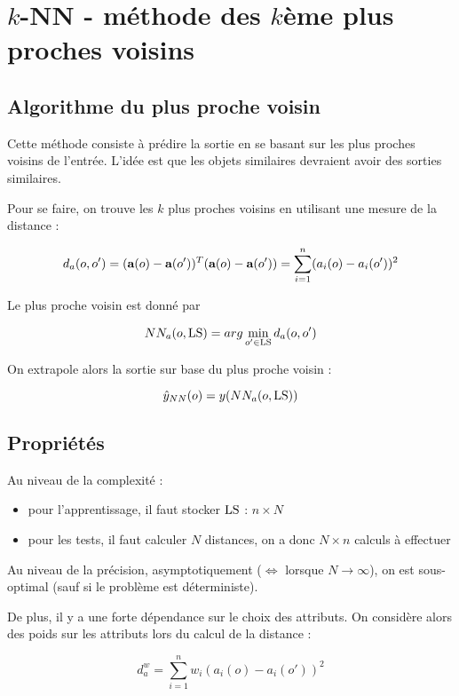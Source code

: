 \chapter{$k$-NN - méthode des $k$ème plus proches voisins}

	\section{Algorithme du plus proche voisin}
		
	Cette méthode consiste à prédire la sortie en se basant sur les plus proches voisins de l'entrée. L'idée est que les objets similaires devraient avoir des sorties similaires.
		
		
	Pour se faire, on trouve les $k$ plus proches voisins en utilisant une mesure de la distance :
	
	$$d_a(o, o') = (\textbf{a}(o) - \textbf{a}(o'))^T(\textbf{a}(o) - \textbf{a}(o')) = \sum_{i = 1}^n(a_i(o) - a_i(o'))^2$$
	
	Le plus proche voisin est donné par
	
	$$NN_a(o, \text{LS}) = arg \min_{o' \in \text{LS}} d_a(o, o')$$
	
	On extrapole alors la sortie sur base du plus proche voisin :
	
	$$\hat{y}_{NN}(o) = y(NN_a(o, \text{LS}))$$
	
	\section{Propriétés}
	
	Au niveau de la complexité :
	
	\begin{itemize}
		\item pour l'apprentissage, il faut stocker $\text{LS}$ : $n \times N$
		\item pour les tests, il faut calculer $N$ distances, on a donc $N \times n$ calculs à effectuer
	\end{itemize}
	
	Au niveau de la précision, asymptotiquement ($\Leftrightarrow$ lorsque $N \rightarrow \infty$), on est sous-optimal (sauf si le problème est déterministe).
	
	De plus, il y a une forte dépendance sur le choix des attributs. On considère alors des poids sur les attributs lors du calcul de la distance :
	
	$$d_a^w = \sum_{i = 1}^n w_i (a_i(o) - a_i(o'))^2$$
	
	
